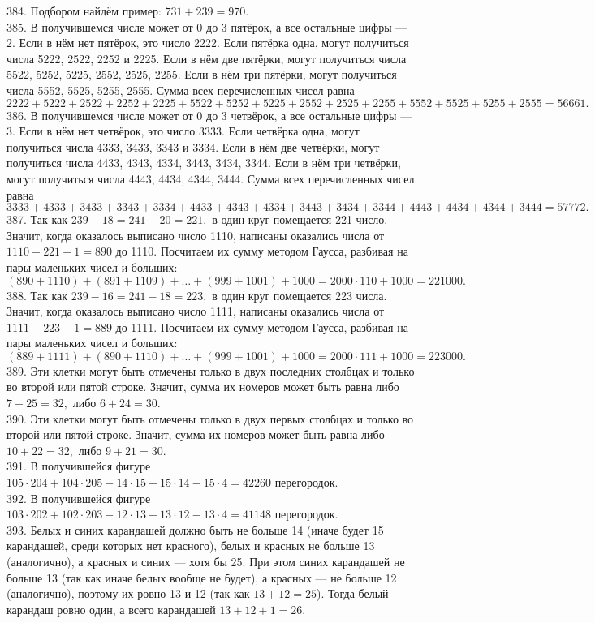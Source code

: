 384. Подбором найдём пример: $731+239=970.$\\
385. В получившемся числе может от 0 до 3 пятёрок, а все остальные цифры --- 2. Если в нём нет пятёрок, это число 2222. Если пятёрка одна, могут получиться числа 5222, 2522, 2252 и 2225. Если в нём две пятёрки, могут получиться числа 5522, 5252, 5225, 2552, 2525, 2255. Если в нём три пятёрки, могут получиться числа 5552, 5525, 5255, 2555. Сумма всех перечисленных чисел равна
$2222+5222+2522+2252+2225+5522+5252+5225+2552+2525+2255+5552+5525+5255+2555=
56661.$\\
386. В получившемся числе может от 0 до 3 четвёрок, а все остальные цифры --- 3. Если в нём нет четвёрок, это число 3333. Если четвёрка одна, могут получиться числа 4333, 3433, 3343 и 3334. Если в нём две четвёрки, могут получиться числа 4433, 4343, 4334, 3443, 3434, 3344. Если в нём три четвёрки, могут получиться числа 4443, 4434, 4344, 3444. Сумма всех перечисленных чисел равна
$3333+4333+3433+3343+3334+4433+4343+4334+3443+3434+3344+4443+4434+4344+3444=
57772.$\\
387. Так как $239-18=241-20=221,$ в один круг помещается 221 число. Значит, когда оказалось выписано число 1110, написаны оказались числа от $1110-221+1=890$ до 1110. Посчитаем их сумму методом Гаусса, разбивая на пары маленьких чисел и больших: $(890+1110)+(891+1109)+\ldots+(999+1001)+1000=
2000\cdot110+1000=221000.$\\
388. Так как $239-16=241-18=223,$ в один круг помещается 223 числа. Значит, когда оказалось выписано число 1111, написаны оказались числа от $1111-223+1=889$ до 1111. Посчитаем их сумму методом Гаусса, разбивая на пары маленьких чисел и больших: $(889+1111)+(890+1110)+\ldots+(999+1001)+1000=
2000\cdot111+1000=223000.$\\
389. Эти клетки могут быть отмечены только в двух последних столбцах и только во второй или пятой строке. Значит, сумма их номеров может быть равна либо $7+25=32,$ либо $6+24=30.$\\
390. Эти клетки могут быть отмечены только в двух первых столбцах и только во второй или пятой строке. Значит, сумма их номеров может быть равна либо $10+22=32,$ либо $9+21=30.$\\
391. В получившейся фигуре $105\cdot204+104\cdot205-14\cdot15-15\cdot14-15\cdot4=42260$ перегородок.\\
392. В получившейся фигуре $103\cdot202+102\cdot203-12\cdot13-13\cdot12-13\cdot4=41148$ перегородок.\\
393. Белых и синих карандашей должно быть не больше 14 (иначе будет 15 карандашей, среди которых нет красного), белых и красных не больше 13 (аналогично), а красных и синих --- хотя бы 25. При этом синих карандашей не больше 13 (так как иначе белых вообще не будет), а красных --- не больше 12 (аналогично), поэтому их ровно 13 и 12 (так как $13+12=25$). Тогда белый карандаш ровно один, а всего карандашей $13+12+1=26.$\\
